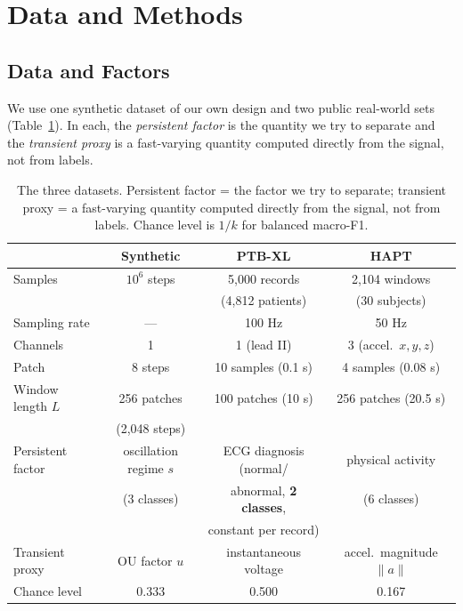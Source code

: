 \section{Data and Methods}

\subsection{Data and Factors}

We use one synthetic dataset of our own design and two public real-world sets (Table~\ref{tab:datasets}). In each, the \emph{persistent factor} is the quantity we try to separate and the \emph{transient proxy} is a fast-varying quantity computed directly from the signal, not from labels.

\begin{table}[!tbp]
\caption{The three datasets. Persistent factor = the factor we try to separate; transient proxy = a fast-varying quantity computed directly from the signal, not from labels. Chance level is $1/k$ for balanced macro-F1.}
\label{tab:datasets}
\centering
\small
\begin{tabular}{lccc}
\hline
 & Synthetic & PTB-XL & HAPT \\
\hline
Samples & $10^6$ steps & 5,000 records & 2,104 windows \\
 & & (4,812 patients) & (30 subjects) \\
Sampling rate & --- & 100 Hz & 50 Hz \\
Channels & 1 & 1 (lead II) & 3 (accel.\ $x,y,z$) \\
Patch & 8 steps & 10 samples (0.1 s) & 4 samples (0.08 s) \\
Window length $L$ & 256 patches & 100 patches (10 s) & 256 patches (20.5 s) \\
 & (2,048 steps) & & \\
Persistent factor & oscillation regime $s$ & ECG diagnosis (normal/ & physical activity \\
 & (3 classes) & abnormal, \textbf{2 classes}, & (6 classes) \\
 & & constant per record) & \\
Transient proxy & OU factor $u$ & instantaneous voltage & accel.\ magnitude $\lVert a\rVert$ \\
Chance level & 0.333 & 0.500 & 0.167 \\
\hline
\end{tabular}
\end{table}

